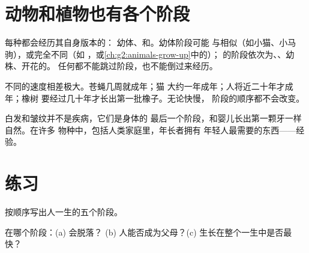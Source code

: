 \section{动物和植物也有各个阶段}

\begin{proposition}[生物界中的各个阶段]\label{prop:g3:stages-of-life:animals}
每种都会经历其自身版本的：
幼体、和。幼体阶段可能
与相似（如小猫、小马驹），或完全不同（如
，或\cref{ch:g2:animals-grow-up}中的）；
的阶段依次为、、幼株、开花的。
任何都不能跳过阶段，也不能倒过来经历。
\end{proposition}
\admitted

\begin{example}[快与慢]\label{ex:g3:stages-of-life:speeds}
不同的速度相差极大。苍蝇几周就成年；猫
大约一年成年；人将近二十年才成年；橡树
要经过几十年才长出第一批橡子。无论快慢，
阶段的顺序都不会改变。
\end{example}

\begin{remark}\label{rem:g3:stages-of-life:oldage}
白发和皱纹并不是疾病，它们是身体的
最后一个阶段，和婴儿长出第一颗牙一样自然。在许多
物种中，包括人类家庭里，年长者拥有
年轻人最需要的东西——经验。
\end{remark}

\section{练习}

\begin{exercise}[$\star$]\label{exo:g3:stages-of-life:1}
按顺序写出人一生的五个阶段。
\end{exercise}

\begin{exercise}[$\star$]\label{exo:g3:stages-of-life:2}
在哪个阶段：(a) 会脱落？
(b) 人能否成为父母？(c) 生长在整个一生中是否最快？
\end{exercise}

